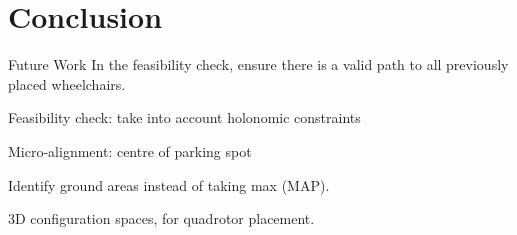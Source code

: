 \chapter{Conclusion}
\label{ch:conclusion}


Future Work
In the feasibility check, ensure there is a valid path to all previously
placed wheelchairs.

Feasibility check: take into account holonomic constraints

Micro-alignment: centre of parking spot

Identify ground areas instead of taking max (MAP). 

3D configuration spaces, for quadrotor placement.


